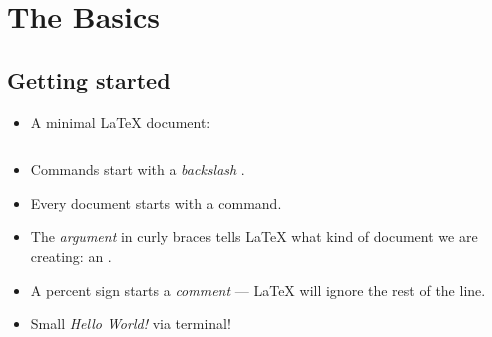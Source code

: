 \documentclass{beamer}
\begin{document}



\section{The Basics}

\subsection{Getting started}
\begin{frame}[fragile]{\insertsubsection}
\begin{itemize}
\item A minimal \LaTeX{} document:
\inputminted[frame=single]{latex}{basics.tex}
\item Commands start with a \emph{backslash} \keystrokebftt{\bs}.
\item Every document starts with a  command.
\item The \emph{argument} in curly braces \keystrokebftt{\{} \keystrokebftt{\}} tells \LaTeX{} what kind of document we are creating: an .
\item A percent sign \keystrokebftt{\%} starts a \emph{comment} --- \LaTeX{}
will ignore the rest of the line.
\item \alert{Small \emph{Hello World!} via terminal!}
\end{itemize}
\end{frame}
\end{document}
